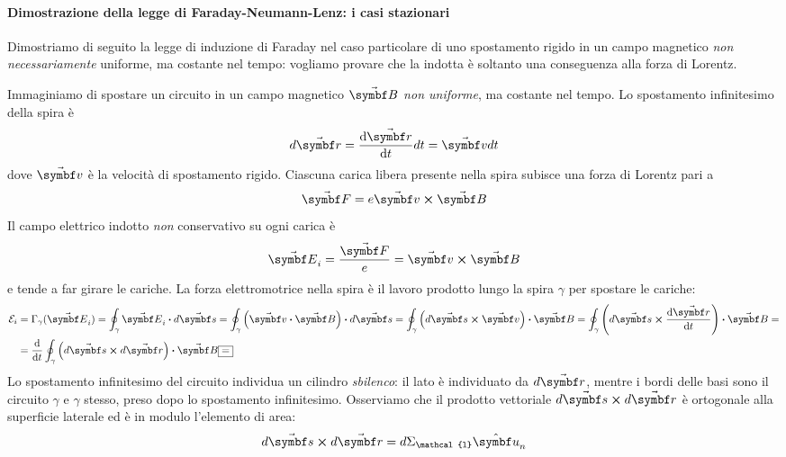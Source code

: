\paragraph{Dimostrazione della legge di Faraday-Neumann-Lenz: i casi stazionari}
Dimostriamo di seguito la legge di induzione di Faraday nel caso particolare di uno spostamento rigido in un campo magnetico \textit{non necessariamente} uniforme, ma costante nel tempo: vogliamo provare che la \fem indotta è soltanto una conseguenza alla forza di Lorentz.
\begin{demonstration}
	Immaginiamo di spostare un circuito in un campo magnetico $\vba{B}$ \textit{non uniforme}, ma costante nel tempo. Lo spostamento infinitesimo della spira è
	\begin{equation*}
		d\vba{r}=\dv{\vba{r}}{t}dt=\vba{v}dt
	\end{equation*}
	dove $\vba{v}$ è la velocità di spostamento rigido.	Ciascuna carica libera presente nella spira subisce una forza di Lorentz pari a
	\begin{equation*}
		\vba{F}=e\vba{v}\cross\vba{B}
	\end{equation*}
	Il campo elettrico indotto \textit{non} conservativo su ogni carica è
	\begin{equation*}
		\vba{E}_i=\frac{\vba{F}}{e}=\vba{v}\cross\vba{B}
	\end{equation*}
	e tende a far girare le cariche. La forza elettromotrice nella spira è il lavoro prodotto lungo la spira $\gamma$ per spostare le cariche:
	\begin{align*}
		\mathcal{E}_i&=\Gamma_{\gamma}(\vba{E}_i)=\oint_{\gamma} \vba{E}_i\vdot d\vba{s}=\oint_{\gamma} \left(\vba{v}\vdot \vba{B}\right)\vdot d\vba{s}=\oint_{\gamma} \left(d\vba{s}\cross\vba{v}\right)\vdot \vba{B} = \oint_{\gamma} \left(d\vba{s}\cross\dv{\vba{r}}{t}\right)\vdot \vba{B}=\\
		&=\dv{t} \oint_{\gamma}\left(d\vba{s}\cross d\vba{r}\right)\vdot \vba{B}\squarequal
	\end{align*}
	Lo spostamento infinitesimo del circuito individua un cilindro \textit{sbilenco}: il lato è individuato da $d\vba{r}$, mentre i bordi delle basi sono il circuito $\gamma$ e $\gamma$ stesso, preso dopo lo spostamento infinitesimo. Osserviamo che il prodotto vettoriale $d\vba{s}\cross d\vba{r}$ è ortogonale alla superficie laterale ed è in modulo l'elemento di area:
	\begin{equation*}
		d\vba s\cross d\vba r=d\Sigma_{\mathcal{l}}\vbh u_n
	\end{equation*}

\end{demonstration}

